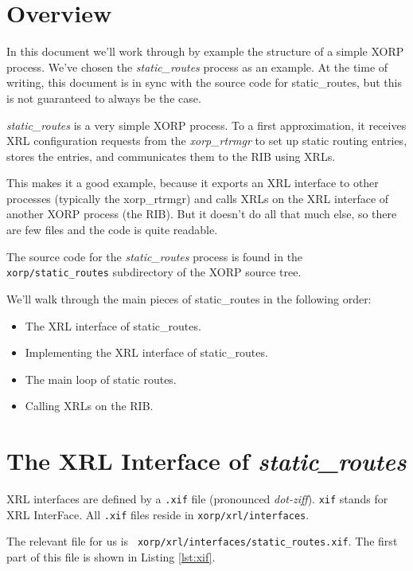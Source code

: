 \documentclass[11pt]{article}
\newcommand{\stt}{\tt\small}
\newcommand{\SRI}{{\it static\_routes}\xspace}
\begin{document}
\section{Overview}

In this document we'll work through by example the structure of a
simple XORP process.  We've chosen the {\it static\_routes} process as
an example.  At the time of writing, this document is in sync with the
source code for static\_routes, but this is not guaranteed to always be
the case.

{\it static\_routes} is a very simple XORP process.  To a first
approximation, it receives XRL configuration requests from the
{\it xorp\_rtrmgr} to set up static routing entries, stores the entries, and
communicates them to the RIB using XRLs.  

This makes it a good example, because it exports an XRL interface to
other processes (typically the xorp\_rtrmgr) and calls XRLs on the XRL
interface of another XORP process (the RIB).  But it doesn't do all
that much else, so there are few files and the code is quite readable.

The source code for the \SRI process is found in the {\stt
xorp/static\_routes} subdirectory of the XORP source tree.

We'll walk through the main pieces of static\_routes in the following
order:

\begin{itemize}
\item The XRL interface of static\_routes.
\item Implementing the XRL interface of static\_routes.
\item The main loop of static routes.
\item Calling XRLs on the RIB.
\end{itemize}


\newpage
\section{The XRL Interface of {\it static\_routes}}

XRL interfaces are defined by a {\stt.xif} file (pronounced {\it dot-ziff}).
{\stt xif} stands for XRL InterFace.  All {\stt.xif} files reside in
{\stt xorp/xrl/interfaces}.

The relevant file for us is {\stt
xorp/xrl/interfaces/static\_routes.xif}. The first part of this file is
shown in Listing \ref{lst:xif}.
\end{document}
